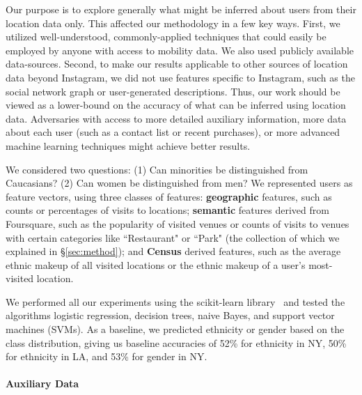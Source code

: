 Our purpose is to explore generally what might be inferred about users from their location data only.
This affected our methodology in a few key ways.
First, we utilized well-understood, commonly-applied techniques that could easily be employed by anyone with access to mobility data.
We also used publicly available data-sources. 
Second, to make our results applicable to other sources of location data beyond Instagram, we did not use features specific to Instagram, such as the social network graph or user-generated descriptions.
Thus, our work should be viewed as a lower-bound on the accuracy of what can be inferred using location data. 
Adversaries with access to more detailed auxiliary information, more data about each user (such as a contact list or recent purchases), or more advanced machine learning techniques might achieve better results.

We considered two questions: (1) Can minorities be distinguished from Caucasians? (2) Can women be distinguished from men?
We represented users as feature vectors, using three classes of features:
\textbf{geographic} features, such as counts or percentages of visits to locations; 
\textbf{semantic} features derived from Foursquare, such as the popularity of visited venues or counts of visits to venues with certain categories like ``Restaurant" or ``Park" (the collection of which we explained in \S\ref{sec:method}); 
and \textbf{Census} derived features, such as the average ethnic makeup of all visited locations or the ethnic makeup of a user's most-visited location.

We performed all our experiments using the scikit-learn library~\cite{scikit-learn} and tested the algorithms logistic regression, decision trees, naive Bayes, and support vector machines (SVMs). 
As a baseline, we predicted ethnicity or gender based on the class distribution, giving us baseline accuracies of 52\% for ethnicity in NY, 50\% for ethnicity in LA, and 53\% for gender in NY. 

\paragraph{Auxiliary Data}

